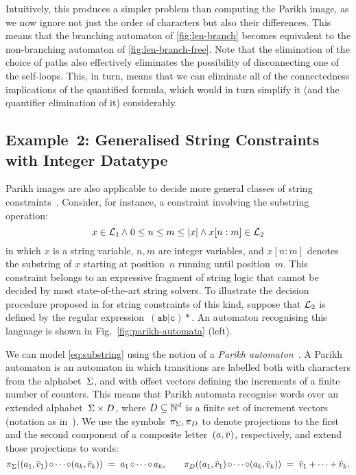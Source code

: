 \documentclass[acmsmall,review,anonymous,screen]{acmart}\settopmatter{printfolios=true,printccs=false,printacmref=true}
\theoremstyle{definition}
\begin{document}
Intuitively, this produces a simpler problem than computing the Parikh image, as
we now ignore not just the order of characters but also their differences.
This
means that the branching automaton of \cref{fig:len-branch} becomes
equivalent to the non-branching automaton of \cref{fig:len-branch-free}.
Note that the elimination of the choice of paths also effectively eliminates the
possibility of disconnecting one of the self-loops. This, in turn, means that we
can eliminate all of the connectedness implications of the quantified formula,
which would in turn simplify it (and the quantifier elimination of it)
considerably.

\subsection{Example~2: Generalised String Constraints with Integer
  Datatype}\label{sec:parikh-automata}

Parikh images are also applicable to decide more general classes of
string constraints~\cite{ostrich-plus}. Consider, for instance, a
constraint involving the substring operation:
\begin{equation}
  \label{eq:substring}
  x \in \operatorname{\mathcal{L}}_1 \wedge \; 0 \leq n \leq m \leq |x| \wedge x[n:m] \in \operatorname{\mathcal{L}}_2
\end{equation}
in which $x$ is a string variable, $n, m$ are integer variables, and
$x[n:m]$ denotes the substring of $x$ starting at position~$n$ running
until position~$m$. This constraint belongs to an expressive fragment
of string logic that cannot be decided by most state-of-the-art string
solvers. To illustrate the decision procedure proposed in
\cite{ostrich-plus} for string constraints of this kind, suppose that
$\operatorname{\mathcal{L}}_2$ is defined by the regular
expression~$\mathtt{(ab|c)*}$. An automaton recognising this language
is shown in Fig.~\ref{fig:parikh-automata} (left).

We can model \eqref{eq:substring} using the notion of a \emph{Parikh
  automaton}~\cite{parikh-automata,expressiveness}. A Parikh automaton
is an automaton in which transitions are labelled both with characters
from the alphabet~$\Sigma$, and with offset vectors defining the
increments of a finite number of counters. This means that Parikh
automata recognise words over an extended
alphabet~$\Sigma \times D$, where $D \subseteq \mathbb{N}^d$ is a
finite set of increment vectors (notation as
in~\cite{expressiveness}). We use the symbols~$\pi_\Sigma, \pi_D$
to denote projections to the first and the second component of a
composite letter~$(a, \bar{v})$, respectively, and extend those
projections to words:
\begin{equation*}
  \pi_\Sigma((a_1, \bar{v}_1) \operatorname{\circ} \cdots \operatorname{\circ} (a_k, \bar{v}_k))
  ~=~ a_1 \operatorname{\circ} \cdots \operatorname{\circ} a_k,
  \qquad
  \pi_D((a_1, \bar{v}_1) \operatorname{\circ} \cdots \operatorname{\circ} (a_k, \bar{v}_k))
  ~=~ \bar{v}_1 + \cdots + \bar{v}_k.
\end{equation*}
\end{document}
